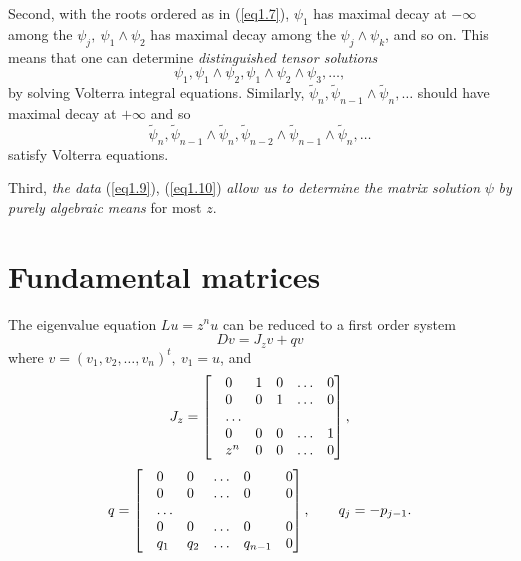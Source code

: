 \documentclass{surv-l}
\theoremstyle{plain}
\theoremstyle{definition}
\numberwithin{equation}{chapter}
\begin{document}
Second, with the roots ordered as in (\ref{eq1.7}), $\psi_{1}$ has maximal decay at $-\infty$ among the $\psi_{j},\ \psi_{1}\wedge\psi_{2}$ has maximal decay among the $\psi_{j}\wedge\psi_{k}$, and so on. This means that one can determine \emph{distinguished tensor solutions}
\begin{equation}\label{eq1.9}
\psi_{1},\psi_{1}\wedge\psi_{2}, \psi_{1}\wedge\psi_{2}\wedge\psi_{3}, \ldots,
\end{equation}
by solving Volterra integral equations. Similarly, $\tilde{\psi}_{n},\tilde{\psi}_{n-1}\wedge\tilde{\psi}_{n},\ldots$ should have maximal decay at $+\infty$ and so
\begin{equation}\label{eq1.10}
\tilde{\psi}_{n},\tilde{\psi}_{n-1}\wedge\tilde{\psi}_{n},\tilde{\psi}_{n-2}\wedge\tilde{\psi}_{n-1}\wedge\tilde{\psi}_{n}, \ldots
\end{equation}
satisfy Volterra equations.

Third, \emph{the data} (\ref{eq1.9}), (\ref{eq1.10}) \emph{allow us to determine the matrix solution} $\psi$ \emph{by purely algebraic means} for most $z$.

\section{Fundamental matrices}\label{sec2}The eigenvalue equation $Lu=z^{n}u$ can be reduced to a first order system
\renewcommand{\theequation}{\thesection.\arabic{equation}}
\setcounter{equation}{0}
\begin{equation}\label{eq2.1}
Dv=J_{z}v+qv
\end{equation}
where $v=(v_{1}, v_{2},\ldots,v_{n})^{t},\ v_{1}=u$, and
\begin{equation}\label{eq2.2}
J_{z}
=\left[\begin{array}{@{}llllll@{}}
&0 &1 &0&\ldots&0\\
&0&0&1&\ldots&0\\
&\ldots&&&&\\
&0&0&0&\ldots&1\\
&z^{n}&0&0&\ldots&0\end{array}\right],
\end{equation}
\begin{equation}\label{eq2.3}
q=\left[\begin{array}{@{}llllll@{}}
&0 &0 &\ldots&0&0\\
&0&0&\ldots&0&0\\
&\ldots&&&&\\
&0&0&\ldots&0&0\\
&q_{1}&q_{2}&\ldots&q_{n-1}&0\end{array}\right], \qquad q_{j}=-p_{j-1}.
\end{equation}
\end{document}
